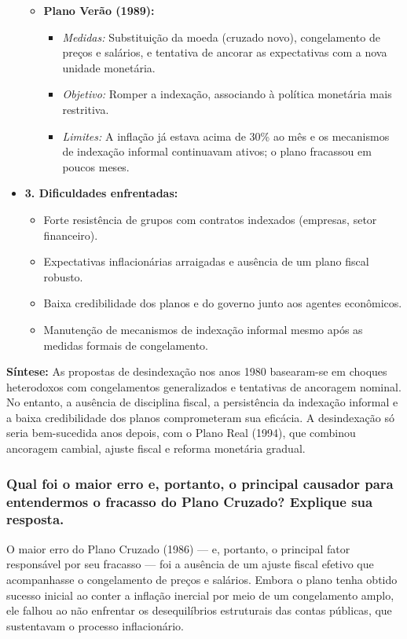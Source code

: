 \documentclass[a4paper,12pt]{article}[abntex2]
\begin{document}
\begin{itemize}
\begin{itemize}
        \item \textbf{Plano Verão (1989):}
        \begin{itemize}
            \item \textit{Medidas:} Substituição da moeda (cruzado novo), congelamento de preços e salários, e tentativa de ancorar as expectativas com a nova unidade monetária.
            \item \textit{Objetivo:} Romper a indexação, associando à política monetária mais restritiva.
            \item \textit{Limites:} A inflação já estava acima de 30\% ao mês e os mecanismos de indexação informal continuavam ativos; o plano fracassou em poucos meses.
        \end{itemize}
    \end{itemize}

    \item \textbf{3. Dificuldades enfrentadas:}
    \begin{itemize}
        \item Forte resistência de grupos com contratos indexados (empresas, setor financeiro).
        \item Expectativas inflacionárias arraigadas e ausência de um plano fiscal robusto.
        \item Baixa credibilidade dos planos e do governo junto aos agentes econômicos.
        \item Manutenção de mecanismos de indexação informal mesmo após as medidas formais de congelamento.
    \end{itemize}
\end{itemize}

\textbf{Síntese:} As propostas de desindexação nos anos 1980 basearam-se em choques heterodoxos com congelamentos generalizados e tentativas de ancoragem nominal. No entanto, a ausência de disciplina fiscal, a persistência da indexação informal e a baixa credibilidade dos planos comprometeram sua eficácia. A desindexação só seria bem-sucedida anos depois, com o Plano Real (1994), que combinou ancoragem cambial, ajuste fiscal e reforma monetária gradual.

\subsubsection{\textbf{Qual foi o maior erro e, portanto, o principal causador para entendermos o fracasso do Plano Cruzado? Explique sua resposta.}}

O maior erro do Plano Cruzado (1986) — e, portanto, o principal fator responsável por seu fracasso — foi a ausência de um ajuste fiscal efetivo que acompanhasse o congelamento de preços e salários. Embora o plano tenha obtido sucesso inicial ao conter a inflação inercial por meio de um congelamento amplo, ele falhou ao não enfrentar os desequilíbrios estruturais das contas públicas, que sustentavam o processo inflacionário.
\end{document}
